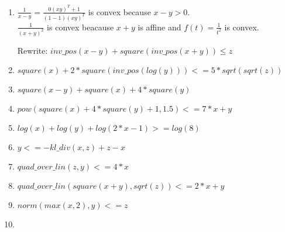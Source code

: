 \documentclass[12pt,letterpaper]{article}
\begin{document}
\begin{alphalist}
    \item
    \item
        \begin{enumerate}
            \item $\frac{1}{x - y} = \frac{0 (x y)^T + 1}{(1 -1)(x y)^T}$ is
                convex because $x - y > 0$.\\
                $\frac{1}{(x + y)^2}$ is convex beacause ${x + y}$ is affine
                and $f(t) = \frac{1}{t^2}$ is convex.

                Rewrite: $inv\_pos(x - y) + square(inv\_pos(x+y)) \le z$

            \item $square(x) + 2 * square(inv\_pos(log(y))) <= 5 * sqrt(sqrt(z))$
            \item $square(x - y) + square(x) + 4 * square(y)$
            \item $pow(square(x) + 4 * square(y) + 1, 1.5) <= 7 * x + y$
            \item $log(x) + log(y) + log(2 * x - 1) >= log(8)$
            \item $y <= -kl\_div(x, z) + z - x$
            \item $quad\_over\_lin(z, y) <= 4 * x$
            \item $quad\_over\_lin(square(x + y), sqrt(z)) <= 2 * x + y$
            \item $norm(max(x, 2), y) <= z$
            \item 


        \end{enumerate}
\end{alphalist}
\end{document}
